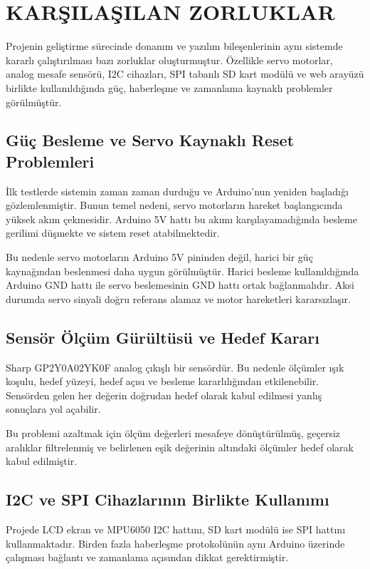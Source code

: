 \section{KARŞILAŞILAN ZORLUKLAR}

Projenin geliştirme sürecinde donanım ve yazılım bileşenlerinin aynı sistemde kararlı çalıştırılması bazı zorluklar oluşturmuştur. Özellikle servo motorlar, analog mesafe sensörü, I2C cihazları, SPI tabanlı SD kart modülü ve web arayüzü birlikte kullanıldığında güç, haberleşme ve zamanlama kaynaklı problemler görülmüştür.

\subsection{Güç Besleme ve Servo Kaynaklı Reset Problemleri}
İlk testlerde sistemin zaman zaman durduğu ve Arduino'nun yeniden başladığı gözlemlenmiştir. Bunun temel nedeni, servo motorların hareket başlangıcında yüksek akım çekmesidir. Arduino 5V hattı bu akımı karşılayamadığında besleme gerilimi düşmekte ve sistem reset atabilmektedir.

Bu nedenle servo motorların Arduino 5V pininden değil, harici bir güç kaynağından beslenmesi daha uygun görülmüştür. Harici besleme kullanıldığında Arduino GND hattı ile servo beslemesinin GND hattı ortak bağlanmalıdır. Aksi durumda servo sinyali doğru referans alamaz ve motor hareketleri kararsızlaşır.

\subsection{Sensör Ölçüm Gürültüsü ve Hedef Kararı}
Sharp GP2Y0A02YK0F analog çıkışlı bir sensördür. Bu nedenle ölçümler ışık koşulu, hedef yüzeyi, hedef açısı ve besleme kararlılığından etkilenebilir. Sensörden gelen her değerin doğrudan hedef olarak kabul edilmesi yanlış sonuçlara yol açabilir.

Bu problemi azaltmak için ölçüm değerleri mesafeye dönüştürülmüş, geçersiz aralıklar filtrelenmiş ve belirlenen eşik değerinin altındaki ölçümler hedef olarak kabul edilmiştir.

\subsection{I2C ve SPI Cihazlarının Birlikte Kullanımı}
Projede LCD ekran ve MPU6050 I2C hattını, SD kart modülü ise SPI hattını kullanmaktadır. Birden fazla haberleşme protokolünün aynı Arduino üzerinde çalışması bağlantı ve zamanlama açısından dikkat gerektirmiştir.

